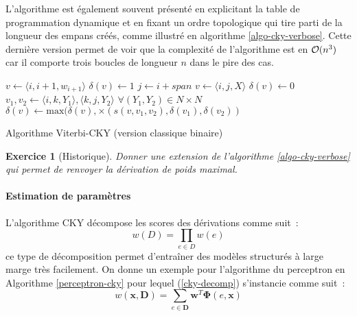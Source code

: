 \documentclass[11pt,openany]{book}
\newtheorem{exo}{Exercice}[chapter]
\begin{document}
L'algorithme est également souvent présenté en explicitant la table de programmation dynamique et en fixant un ordre topologique 
qui tire parti de la longueur des empans créés, comme illustré en algorithme \ref{algo-cky-verbose}.
Cette dernière version permet de voir que la complexité de l'algorithme est en ${\cal O}(n^3)$ car il comporte trois boucles de longueur $n$
dans le pire des cas.

\begin{algorithm}[htbp]
\begin{algorithmic}
\State $v \gets \langle i,i+1,w_{i+1} \rangle$
\State $\delta(v) \gets 1$
\EndFor
{}
\State $j \gets i+span$
\State $v \gets \langle i,j,X \rangle$
\State $\delta(v) \gets 0$
\State $v_1,v_2 \gets \langle i,k,Y_1 \rangle,\langle k,j,Y_2 \rangle$ \qquad $\forall (Y_1,Y_2) \in N\times N$
\State $\delta(v) \gets \text{max}(\delta(v), \times(s(v,v_1,v_2),\delta(v_1),\delta(v_2))$
\EndFor
\EndFor
\EndFor
\EndFor
\EndFunction
\end{algorithmic}
\caption{\label{algo-cky-verbose} Algorithme Viterbi-CKY (version classique binaire)}
\end{algorithm}

\begin{exo}[Historique]
Donner une extension de l'algorithme \ref{algo-cky-verbose} qui permet de renvoyer la dérivation de poids maximal.
\end{exo}


\paragraph{Estimation de paramètres}
L'algorithme CKY décompose les scores des dérivations comme suit~:
\begin{equation}
\label{cky-decomp}
w(D) = \prod_{e\in D} w(e) 
\end{equation}
ce type de décomposition permet d'entraîner des modèles structurés à large marge très facilement.
On donne un exemple pour l'algorithme du perceptron en Algorithme \ref{perceptron-cky} 
pour lequel (\ref{cky-decomp}) s'instancie comme suit~:
\begin{displaymath}
w(\mathbf{x},\mathbf{D}) = \sum_{e\in \mathbf{D}} \mathbf{w}^T \boldsymbol\Phi(e,\mathbf{x}) 
\end{displaymath}
\end{document}
